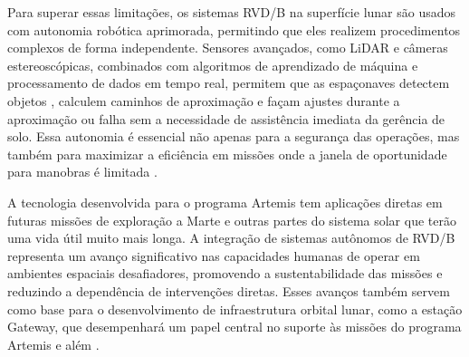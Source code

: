 Para superar essas limitações, os sistemas RVD/B na superfície lunar são usados com autonomia robótica aprimorada, permitindo que eles realizem procedimentos complexos de forma independente. Sensores avançados, como LiDAR \cite{farkasvolgyi2023} e câmeras estereoscópicas, combinados com algoritmos de aprendizado de máquina e processamento de dados em tempo real, permitem que as espaçonaves detectem objetos \cite{ibmComputerVision}, calculem caminhos de aproximação e façam ajustes durante a aproximação ou falha sem a necessidade de assistência imediata da gerência de solo. Essa autonomia é essencial não apenas para a segurança das operações, mas também para maximizar a eficiência em missões onde a janela de oportunidade para manobras é limitada \cite{fehse2003}.

A tecnologia desenvolvida para o programa Artemis tem aplicações diretas em futuras missões de exploração a Marte e outras partes do sistema solar que terão uma vida útil muito mais longa. A integração de sistemas autônomos de RVD/B representa um avanço significativo nas capacidades humanas de operar em ambientes espaciais desafiadores, promovendo a sustentabilidade das missões e reduzindo a dependência de intervenções diretas. Esses avanços também servem como base para o desenvolvimento de infraestrutura orbital lunar, como a estação Gateway, que desempenhará um papel central no suporte às missões do programa Artemis e além \cite{nasaGateway}.
